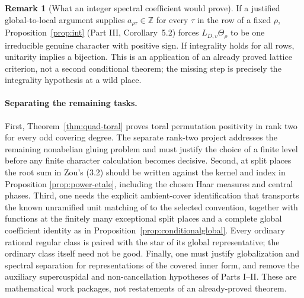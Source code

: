 \documentclass[11pt]{article}
\theoremstyle{plain}
\theoremstyle{definition}
\newtheorem{remark}[theorem]{Remark}
\begin{document}
\begin{remark}[What an integer spectral coefficient would prove]
If a justified global-to-local argument supplies
$a_{\rho\tau}\in\mathbb Z$ for every $\tau$ in the row of a fixed
$\rho$, Proposition~\ref{prop:int} (Part III, Corollary~5.2)
forces $L_{D,v}\Theta_\rho$ to be one irreducible genuine
character with positive sign.  If integrality holds for all
rows, unitarity implies a bijection.  This is an application of
an already proved lattice criterion, not a second conditional
theorem; the missing step is precisely the integrality
hypothesis at a wild place.
\end{remark}

\paragraph{Separating the remaining tasks.}
First, Theorem~\ref{thm:quad-toral} proves toral permutation
positivity in rank two for every odd covering degree.  The separate
rank-two project \cite{RankTwo0} addresses the remaining nonabelian
gluing problem and must justify the choice of a finite level before
any finite character calculation becomes decisive.  Second, at split
places the root sum in Zou's (3.2) should be written against the
kernel and index in Proposition \ref{prop:power-etale}, including
the chosen Haar measures and central phases.  Third, one needs the explicit ambient-cover identification
that transports the known unramified unit matching of
\cite[\S12]{FK} to the selected convention, together with
functions at the finitely many exceptional split places and a
complete global coefficient identity as in
Proposition~\ref{prop:conditionalglobal}. Every ordinary rational regular class is paired with the star of
its global representative; the ordinary class itself need not be
good.
Finally, one must justify globalization and spectral separation
for representations of the covered inner form, and remove the
auxiliary supercuspidal and non-cancellation hypotheses of Parts
I--II.  These are mathematical work packages, not restatements of
an already-proved theorem.
\end{document}
